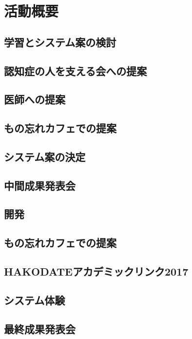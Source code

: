 \documentclass[../report]{subfiles}
\begin{document}
\section{活動概要}
\subsection{学習とシステム案の検討}

\subsection{認知症の人を支える会への提案}

\subsection{医師への提案}

\subsection{もの忘れカフェでの提案}

\subsection{システム案の決定}

\subsection{中間成果発表会}

\subsection{開発}

\subsection{もの忘れカフェでの提案}

\subsection{HAKODATEアカデミックリンク2017}

\subsection{システム体験}

\subsection{最終成果発表会}
\end{document}
